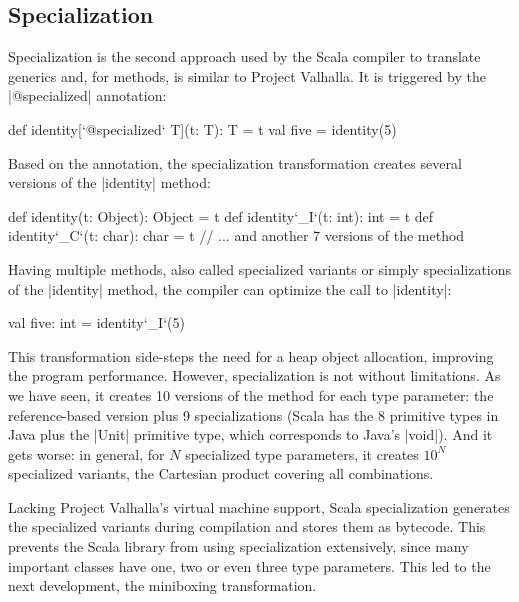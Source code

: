 \subsection{Specialization}

Specialization \cite{specialization-iuli, iuli-thesis} is the second approach used by the Scala compiler to translate generics and, for methods, is similar to Project Valhalla. It is triggered by the |@specialized| annotation:

\begin{lstlisting-nobreak}
 def identity[`@specialized` T](t: T): T = t
 val five = identity(5)
\end{lstlisting-nobreak}

Based on the annotation, the specialization transformation creates several versions of the |identity| method:

\begin{lstlisting-nobreak}
 def identity(t: Object): Object = t
 def identity`_I`(t: int): int = t
 def identity`_C`(t: char): char = t
 // ... and another 7 versions of the method
\end{lstlisting-nobreak}

Having multiple methods, also called specialized variants or simply specializations of the |identity| method, the compiler can optimize the call to |identity|:

\begin{lstlisting-nobreak}
 val five: int = identity`_I`(5)
\end{lstlisting-nobreak}

This transformation side-steps the need for a heap object allocation, improving the program performance. However, specialization is not without limitations. As we have seen, it creates 10 versions of the method for each type parameter: the reference-based version plus 9 specializations (Scala has the 8 primitive types in Java plus the |Unit| primitive type, which corresponds to Java's |void|). And it gets worse: in general, for $N$ specialized type parameters, it creates $10^N$ specialized variants, the Cartesian product covering all combinations.

Lacking Project Valhalla's virtual machine support, Scala specialization generates the specialized variants during compilation and stores them as bytecode. This prevents the Scala library from using specialization extensively, since many important classes have one, two or even three type parameters. This led to the next development, the miniboxing transformation.

